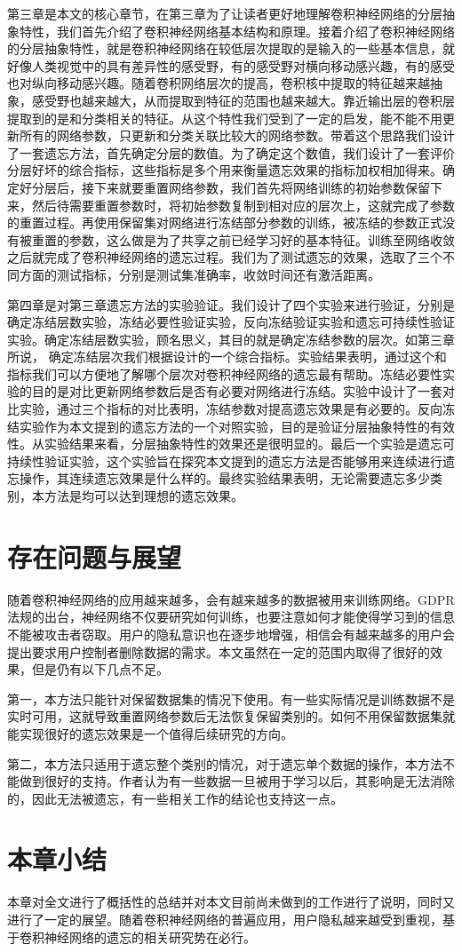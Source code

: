 第三章是本文的核心章节，在第三章为了让读者更好地理解卷积神经网络的分层抽象特性，我们首先介绍了卷积神经网络基本结构和原理。接着介绍了卷积神经网络的分层抽象特性，就是卷积神经网络在较低层次提取的是输入的一些基本信息，就好像人类视觉中的具有差异性的感受野，有的感受野对横向移动感兴趣，有的感受也对纵向移动感兴趣。随着卷积网络层次的提高，卷积核中提取的特征越来越抽象，感受野也越来越大，从而提取到特征的范围也越来越大。靠近输出层的卷积层提取到的是和分类相关的特征。从这个特性我们受到了一定的启发，能不能不用更新所有的网络参数，只更新和分类关联比较大的网络参数。带着这个思路我们设计了一套遗忘方法，首先确定分层的数值。为了确定这个数值，我们设计了一套评价分层好坏的综合指标，这些指标是多个用来衡量遗忘效果的指标加权相加得来。确定好分层后，接下来就要重置网络参数，我们首先将网络训练的初始参数保留下来，然后待需要重置参数时，将初始参数复制到相对应的层次上，这就完成了参数的重置过程。再使用保留集对网络进行冻结部分参数的训练，被冻结的参数正式没有被重置的参数，这么做是为了共享之前已经学习好的基本特征。训练至网络收敛之后就完成了卷积神经网络的遗忘过程。我们为了测试遗忘的效果，选取了三个不同方面的测试指标，分别是测试集准确率，收敛时间还有激活距离。

第四章是对第三章遗忘方法的实验验证。我们设计了四个实验来进行验证，分别是确定冻结层数实验，冻结必要性验证实验，反向冻结验证实验和遗忘可持续性验证实验。确定冻结层数实验，顾名思义，其目的就是确定冻结参数的层次。如第三章所说， 确定冻结层次我们根据设计的一个综合指标。实验结果表明，通过这个和指标我们可以方便地了解哪个层次对卷积神经网络的遗忘最有帮助。冻结必要性实验的目的是对比更新网络参数后是否有必要对网络进行冻结。实验中设计了一套对比实验，通过三个指标的对比表明，冻结参数对提高遗忘效果是有必要的。反向冻结实验作为本文提到的遗忘方法的一个对照实验，目的是验证分层抽象特性的有效性。从实验结果来看，分层抽象特性的效果还是很明显的。最后一个实验是遗忘可持续性验证实验，这个实验旨在探究本文提到的遗忘方法是否能够用来连续进行遗忘操作，其连续遗忘效果是什么样的。最终实验结果表明，无论需要遗忘多少类别，本方法是均可以达到理想的遗忘效果。
\section{存在问题与展望}

随着卷积神经网络的应用越来越多，会有越来越多的数据被用来训练网络。GDPR法规的出台，神经网络不仅要研究如何训练，也要注意如何才能使得学习到的信息不能被攻击者窃取。用户的隐私意识也在逐步地增强，相信会有越来越多的用户会提出要求用户控制者删除数据的需求。本文虽然在一定的范围内取得了很好的效果，但是仍有以下几点不足。

第一，本方法只能针对保留数据集的情况下使用。有一些实际情况是训练数据不是实时可用，这就导致重置网络参数后无法恢复保留类别的。如何不用保留数据集就能实现很好的遗忘效果是一个值得后续研究的方向。

第二，本方法只适用于遗忘整个类别的情况，对于遗忘单个数据的操作，本方法不能做到很好的支持。作者认为有一些数据一旦被用于学习以后，其影响是无法消除的，因此无法被遗忘，有一些相关工作\cite{2018arXiv181205159T}的结论也支持这一点。
\section{本章小结}

本章对全文进行了概括性的总结并对本文目前尚未做到的工作进行了说明，同时又进行了一定的展望。随着卷积神经网络的普遍应用，用户隐私越来越受到重视，基于卷积神经网络的遗忘的相关研究势在必行。
